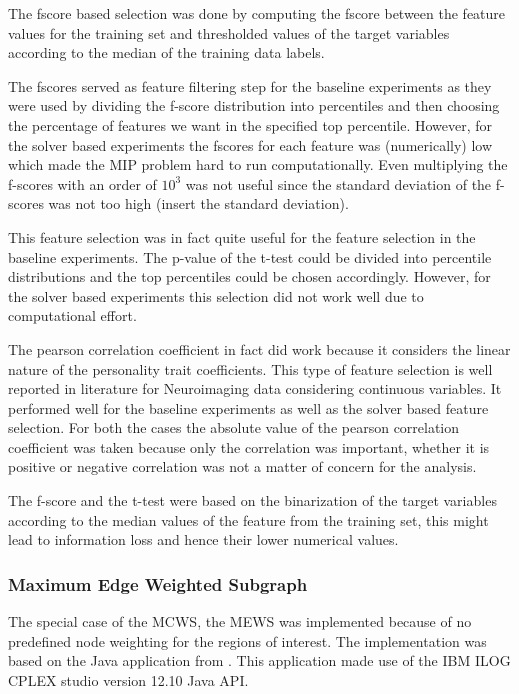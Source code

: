 \documentclass[msthesis.tex]{subfiles}
\begin{document}
The fscore based selection was done by computing the fscore between the feature values for the training set and thresholded values of the target variables according to the median of the training data labels. 

The fscores served as feature filtering step for the baseline experiments as they were used by dividing the f-score distribution into percentiles and then choosing the percentage of features we want in the specified top percentile. However, for the solver based experiments the fscores for each feature was (numerically) low which made the MIP problem hard to run computationally. Even multiplying the f-scores with an order of $10^3$ was not useful since the standard deviation of the f-scores was not too high (insert the standard deviation). 

This feature selection was in fact quite useful for the feature selection in the baseline experiments. The p-value of the t-test could be divided into percentile distributions and the top percentiles could be chosen accordingly. However, for the solver based experiments this selection did not work well due to computational effort. 

The pearson correlation coefficient in fact did work because it considers the linear nature of the personality trait coefficients. This type of feature selection is well reported in literature for Neuroimaging data considering continuous variables. It performed well for the baseline experiments as well as the solver based feature selection. For both the cases the absolute value of the pearson correlation coefficient was taken because only the correlation was important, whether it is positive or negative correlation was not a matter of concern for the analysis.

The f-score and the t-test were based on the binarization of the target variables according to the median values of the feature from the training set, this might lead to information loss and hence their lower numerical values. 
\fi

\subsubsection{Maximum Edge Weighted Subgraph}
\label{method:MEWS}

The special case of the MCWS, the MEWS was implemented because of no predefined node weighting for the regions of interest. The implementation was based on  the Java application from \cite{DBLP:journals/corr/LobodaAS16}. This application made use of the IBM ILOG CPLEX studio version 12.10 Java API. 
\end{document}
